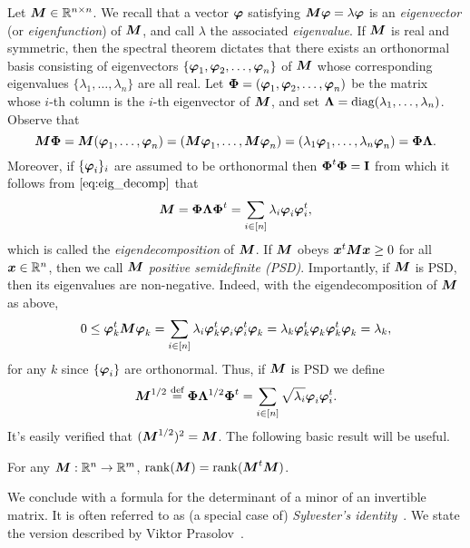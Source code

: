 Let ${\vb*{M}}\in\mathbb{R}^{n\times n}$. We recall that a vector $\vb*{\varphi}$ satisfying ${\vb*{M}}\vb*{\varphi}=\lambda\vb*{\varphi}$ is an \emph{eigenvector} (or \emph{eigenfunction}) of ${\vb*{M}}$, and call $\lambda$ the associated \emph{eigenvalue}. 
If ${\vb*{M}}$ is real and symmetric, then the spectral theorem dictates that there exists an orthonormal basis consisting of eigenvectors $\{\vb*{\varphi}_1,\vb*{\varphi}_2,\dots,\vb*{\varphi}_n\}$ of ${\vb*{M}}$ whose corresponding eigenvalues $\{\lambda_1,\dots,\lambda_n\}$ are all real. Let $\boldsymbol{\Phi}=(\vb*{\varphi}_1,\vb*{\varphi}_2,\dots,\vb*{\varphi}_n)$ be the matrix whose $i$-th column is the $i$-th eigenvector of ${\vb*{M}}$, and set $\vb{\Lambda}=\text{diag}(\lambda_1,\dots,\lambda_n)$. Observe that 
\begin{equation}
\label{eq:eig_decomp}
{\vb*{M}}\boldsymbol{\Phi}={\vb*{M}}(\vb*{\varphi}_1,\dots,\vb*{\varphi}_n)=({\vb*{M}}\vb*{\varphi}_1,\dots,{\vb*{M}}\vb*{\varphi}_n)=(\lambda_1\vb*{\varphi}_1,\dots,\lambda_n\vb*{\varphi}_n)=\boldsymbol{\Phi}\vb{\Lambda}.
\end{equation}
Moreover, if $\{\vb*{\varphi}_i\}_i$ are assumed to be orthonormal then $\boldsymbol{\Phi}^t\boldsymbol{\Phi}=\vb{I}$ from which it follows from $\eqref{eq:eig_decomp}$ that 
\begin{equation}
    \label{eq:eig_decomp2}
    {\vb*{M}}=\boldsymbol{\Phi}\vb{\Lambda}\boldsymbol{\Phi}^t = \sum_{i\in[n]}\lambda_i\vb*{\varphi}_i\vb*{\varphi}_i^t,
\end{equation}
which is called the \emph{eigendecomposition} of ${\vb*{M}}$. 
If ${\vb*{M}}$ obeys  $\vb*{x}^t{\vb*{M}}\vb*{x}\geq 0$ for all  $\vb*{x}\in\mathbb{R}^n$, then we  call ${\vb*{M}}$ \emph{positive semidefinite (PSD)}. Importantly, if ${\vb*{M}}$ is PSD, then its eigenvalues are non-negative. Indeed, with the  eigendecomposition of ${\vb*{M}}$ as  above,  
\[0\leq \vb*{\varphi}_k^t {\vb*{M}}\vb*{\varphi}_k =\sum_{i\in[n]}\lambda_i \vb*{\varphi}_k^t\vb*{\varphi}_i\vb*{\varphi}_i^t\vb*{\varphi}_k = \lambda_k\vb*{\varphi}_k^t\vb*{\varphi}_k\vb*{\varphi}_k^t\vb*{\varphi}_k=\lambda_k,\]
for any $k$ since $\{\vb*{\varphi}_i\}$ are orthonormal. Thus,  if  ${\vb*{M}}$ is PSD we define 
\begin{equation*}
    {\vb*{M}}^{1/2} \overset{\text{def}}{=} \boldsymbol{\Phi}\vb{\Lambda}^{1/2}\boldsymbol{\Phi}^t = \sum_{i\in[n]}\sqrt{\lambda_i}\vb*{\varphi}_i\vb*{\varphi}_i^t.
\end{equation*}
It's easily verified that $({\vb*{M}}^{1/2})^2 = {\vb*{M}}$. The following basic  result will be useful. 

\begin{lemma}
	\label{lem:rank(QtQ)}
	For any ${\vb*{M}}:\mathbb{R}^n\to\mathbb{R}^m$, $\rank({\vb*{M}}) = \rank({\vb*{M}}^t{\vb*{M}})$. 
\end{lemma}

We conclude with a formula for  the determinant of a minor of an invertible matrix.  It is often referred to as (a special  case of) \emph{Sylvester's identity}~\cite{sylvester1851xxxvii}. We state the version described by Viktor Prasolov~\cite{prasolov1994problems}. 

